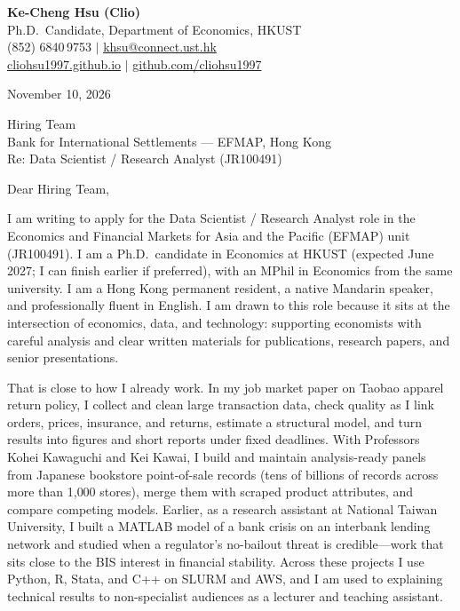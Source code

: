\documentclass[11pt,letterpaper]{article}
\begin{document}
\noindent
{\bfseries Ke-Cheng Hsu (Clio)}\\
Ph.D.\ Candidate, Department of Economics, HKUST\\
(852) 6840\,9753 \quad $|$ \quad \href{mailto:khsu@connect.ust.hk}{khsu@connect.ust.hk}\\
\href{https://cliohsu1997.github.io/}{cliohsu1997.github.io} \quad $|$ \quad \href{https://github.com/cliohsu1997}{github.com/cliohsu1997}

\vspace{0.7em}
\noindent
November 10, 2026

\vspace{0.35em}
\noindent
Hiring Team\\
Bank for International Settlements --- EFMAP, Hong Kong\\
Re: Data Scientist / Research Analyst (JR100491)

\vspace{0.2em}
Dear Hiring Team,

I am writing to apply for the Data Scientist / Research Analyst role in the Economics and Financial Markets for Asia and the Pacific (EFMAP) unit (JR100491). I am a Ph.D.\ candidate in Economics at HKUST (expected June 2027; I can finish earlier if preferred), with an MPhil in Economics from the same university. I am a Hong Kong permanent resident, a native Mandarin speaker, and professionally fluent in English. I am drawn to this role because it sits at the intersection of economics, data, and technology: supporting economists with careful analysis and clear written materials for publications, research papers, and senior presentations.

That is close to how I already work. In my job market paper on Taobao apparel return policy, I collect and clean large transaction data, check quality as I link orders, prices, insurance, and returns, estimate a structural model, and turn results into figures and short reports under fixed deadlines. With Professors Kohei Kawaguchi and Kei Kawai, I build and maintain analysis-ready panels from Japanese bookstore point-of-sale records (tens of billions of records across more than 1{,}000 stores), merge them with scraped product attributes, and compare competing models. Earlier, as a research assistant at National Taiwan University, I built a MATLAB model of a bank crisis on an interbank lending network and studied when a regulator's no-bailout threat is credible---work that sits close to the BIS interest in financial stability. Across these projects I use Python, R, Stata, and C++ on SLURM and AWS, and I am used to explaining technical results to non-specialist audiences as a lecturer and teaching assistant.
\end{document}
